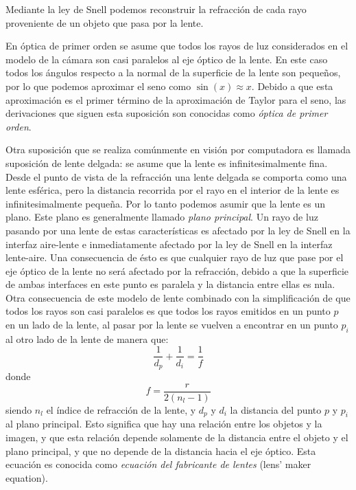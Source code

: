 Mediante la ley de Snell podemos reconstruir la refracción de cada rayo proveniente de un objeto que pasa por la lente.

En óptica de primer orden se asume que todos los rayos de luz considerados en el modelo de la cámara son casi paralelos al eje óptico de la lente. En este caso todos los ángulos respecto a la normal de la superficie de la lente son pequeños, por lo que podemos aproximar el seno como $\sin(x) \approx x$. Debido a que esta aproximación es el primer término de la aproximación de Taylor para el seno, las derivaciones que siguen esta suposición son conocidas como \emph{óptica de primer orden}.

Otra suposición que se realiza comúnmente en visión por computadora es llamada suposición de lente delgada: se asume que la lente es infinitesimalmente fina. Desde el punto de vista de la refracción una lente delgada se comporta como una lente esférica, pero la distancia recorrida por el rayo en el interior de la lente es infinitesimalmente pequeña. Por lo tanto podemos asumir que la lente es un plano. Este plano es generalmente llamado \emph{plano principal}. Un rayo de luz pasando por una lente de estas características es afectado por la ley de Snell en la interfaz aire-lente e inmediatamente afectado por la ley de Snell en la interfaz lente-aire. Una consecuencia de ésto es que cualquier rayo de luz que pase por el eje óptico de la lente no será afectado por la refracción, debido a que la superficie de ambas interfaces en este punto es paralela y la distancia entre ellas es nula. Otra consecuencia de este modelo de lente combinado con la simplificación de que todos los rayos son casi paralelos es que todos los rayos emitidos en un punto $p$ en un lado de la lente, al pasar por la lente se vuelven a encontrar en un punto $p_i$ al otro lado de la lente de manera que:
\begin{equation*}
    \frac{1}{d_p} + \frac{1}{d_i} = \frac{1}{f}
\end{equation*}
donde
\begin{equation*}
    f = \frac{r}{2(n_l-1)}        %
\end{equation*} 
siendo $n_l$ el índice de refracción de la lente, y $d_p$ y $d_i$ la distancia del punto $p$ y $p_i$ al plano principal. Esto significa que hay una relación entre los objetos y la imagen, y que esta relación depende solamente de la distancia entre el objeto y el plano principal, y que no depende de la distancia hacia el eje óptico. Esta ecuación es conocida como \emph{ecuación del fabricante de lentes} (lens' maker equation).

